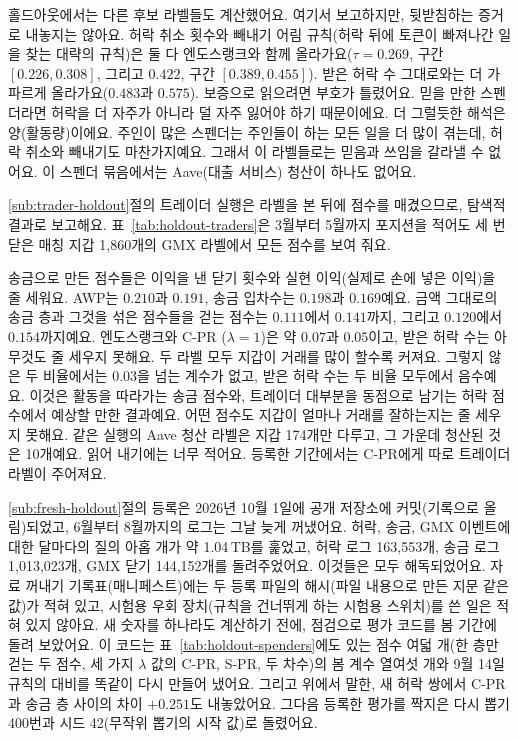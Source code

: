 홀드아웃에서는 다른 후보 라벨들도 계산했어요. 여기서 보고하지만, 뒷받침하는 증거로 내놓지는 않아요. 허락 취소 횟수와 빼내기 어림 규칙(허락 뒤에 토큰이 빠져나간 일을 찾는 대략의 규칙)은 둘 다 엔도스랭크와 함께 올라가요($\tau=0.269$, 구간 $[0.226,0.308]$, 그리고 $0.422$, 구간 $[0.389,0.455]$). 받은 허락 수 그대로와는 더 가파르게 올라가요($0.483$과 $0.575$). 보증으로 읽으려면 부호가 틀렸어요. 믿을 만한 스펜더라면 허락을 더 자주가 아니라 덜 자주 잃어야 하기 때문이에요. 더 그럴듯한 해석은 양(활동량)이에요. 주인이 많은 스펜더는 주인들이 하는 모든 일을 더 많이 겪는데, 허락 취소와 빼내기도 마찬가지예요. 그래서 이 라벨들로는 믿음과 쓰임을 갈라낼 수 없어요. 이 스펜더 묶음에서는 Aave(대출 서비스) 청산이 하나도 없어요.


\ref{sub:trader-holdout}절의 트레이더 실행은 라벨을 본 뒤에 점수를 매겼으므로, 탐색적 결과로 보고해요. 표~\ref{tab:holdout-traders}은 3월부터 5월까지 포지션을 적어도 세 번 닫은 매칭 지갑 1,860개의 GMX 라벨에서 모든 점수를 보여 줘요.



송금으로 만든 점수들은 이익을 낸 닫기 횟수와 실현 이익(실제로 손에 넣은 이익)을 줄 세워요. AWP는 $0.210$과 $0.191$, 송금 입차수는 $0.198$과 $0.169$예요. 금액 그대로의 송금 층과 그것을 섞은 점수들을 걷는 점수는 $0.111$에서 $0.141$까지, 그리고 $0.120$에서 $0.154$까지예요. 엔도스랭크와 C-PR ($\lambda=1$)은 약 $0.07$과 $0.05$이고, 받은 허락 수는 아무것도 줄 세우지 못해요. 두 라벨 모두 지갑이 거래를 많이 할수록 커져요. 그렇지 않은 두 비율에서는 $0.03$을 넘는 계수가 없고, 받은 허락 수는 두 비율 모두에서 음수예요. 이것은 활동을 따라가는 송금 점수와, 트레이더 대부분을 동점으로 남기는 허락 점수에서 예상할 만한 결과예요. 어떤 점수도 지갑이 얼마나 거래를 잘하는지는 줄 세우지 못해요. 같은 실행의 Aave 청산 라벨은 지갑 174개만 다루고, 그 가운데 청산된 것은 10개예요. 읽어 내기에는 너무 적어요. 등록한 기간에서는 C-PR에게 따로 트레이더 라벨이 주어져요.


\ref{sub:fresh-holdout}절의 등록은 2026년 10월 1일에 공개 저장소에 커밋(기록으로 올림)되었고, 6월부터 8월까지의 로그는 그날 늦게 꺼냈어요. 허락, 송금, GMX 이벤트에 대한 달마다의 질의 아홉 개가 약 1.04\,TB를 훑었고, 허락 로그 163,553개, 송금 로그 1,013,023개, GMX 닫기 144,152개를 돌려주었어요. 이것들은 모두 해독되었어요. 자료 꺼내기 기록표(매니페스트)에는 두 등록 파일의 해시(파일 내용으로 만든 지문 같은 값)가 적혀 있고, 시험용 우회 장치(규칙을 건너뛰게 하는 시험용 스위치)를 쓴 일은 적혀 있지 않아요. 새 숫자를 하나라도 계산하기 전에, 점검으로 평가 코드를 봄 기간에 돌려 보았어요. 이 코드는 표~\ref{tab:holdout-spenders}에도 있는 점수 여덟 개(한 층만 걷는 두 점수, 세 가지 $\lambda$ 값의 C-PR, S-PR, 두 차수)의 봄 계수 열여섯 개와 9월 14일 규칙의 대비를 똑같이 다시 만들어 냈어요. 그리고 위에서 말한, 새 허락 쌍에서 C-PR과 송금 층 사이의 차이 $+0.251$도 내놓았어요. 그다음 등록한 평가를 짝지은 다시 뽑기 400번과 시드 42(무작위 뽑기의 시작 값)로 돌렸어요.

